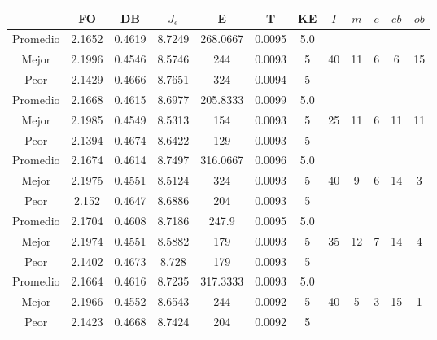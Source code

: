 \begin{table}[h!]
    \footnotesize
    \begin{center}
        \begin{tabular}{|c|c|c|c|c|c|c|c|c|c|c|c|}
        \hline
             & {\bf FO} & {\bf DB} & $J_e$ & {\bf E} & {\bf T} & {\bf KE} & $I$ & $m$ & $e$ & $eb$ & $ob$ \\
        \hline
        \hline
            Promedio  & 2.1652 & 0.4619 & 8.7249 & 268.0667 & 0.0095 & 5.0 &  &  &  &  & \\
            \cline{1-7}
            Mejor & 2.1996 & 0.4546  & 8.5746 & 244 & 0.0093 & 5 & 40 & 11 & 6 & 6 & 15\\
            \cline{1-7}
            Peor & 2.1429 & 0.4666  & 8.7651 & 324 & 0.0094 & 5 &  &  &  &  & \\
        \hline
        \hline
            Promedio  & 2.1668 & 0.4615 & 8.6977 & 205.8333 & 0.0099 & 5.0 &  &  &  &  & \\
            \cline{1-7}
            Mejor & 2.1985 & 0.4549  & 8.5313 & 154 & 0.0093 & 5 & 25 & 11 & 6 & 11 & 11\\
            \cline{1-7}
            Peor & 2.1394 & 0.4674  & 8.6422 & 129 & 0.0093 & 5 &  &  &  &  & \\
        \hline
        \hline
            Promedio  & 2.1674 & 0.4614 & 8.7497 & 316.0667 & 0.0096 & 5.0 &  &  &  &  & \\
            \cline{1-7}
            Mejor & 2.1975 & 0.4551  & 8.5124 & 324 & 0.0093 & 5 & 40 & 9 & 6 & 14 & 3\\
            \cline{1-7}
            Peor & 2.152 & 0.4647  & 8.6886 & 204 & 0.0093 & 5 &  &  &  &  & \\
        \hline
        \hline
            Promedio  & 2.1704 & 0.4608 & 8.7186 & 247.9 & 0.0095 & 5.0 &  &  &  &  & \\
            \cline{1-7}
            Mejor & 2.1974 & 0.4551  & 8.5882 & 179 & 0.0093 & 5 & 35 & 12 & 7 & 14 & 4\\
            \cline{1-7}
            Peor & 2.1402 & 0.4673  & 8.728 & 179 & 0.0093 & 5 &  &  &  &  & \\
        \hline
        \hline
            Promedio  & 2.1664 & 0.4616 & 8.7235 & 317.3333 & 0.0093 & 5.0 &  &  &  &  & \\
            \cline{1-7}
            Mejor & 2.1966 & 0.4552  & 8.6543 & 244 & 0.0092 & 5 & 40 & 5 & 3 & 15 & 1\\
            \cline{1-7}
            Peor & 2.1423 & 0.4668  & 8.7424 & 204 & 0.0092 & 5 &  &  &  &  & \\

\end{tabular}
\end{center}
\end{table}
